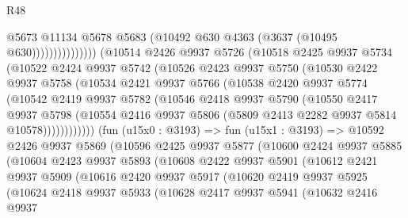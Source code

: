 \begin{lexlean}{R48}
\begin{coremodule}
                                @5673
                                @11134
                                @5678
                                @5683
                                (@10492 @630 @4363 (@3637 (@10495 @630)))))))))))))))
        (@10514
          @2426
          @9937
          @5726
          (@10518
            @2425
            @9937
            @5734
            (@10522
              @2424
              @9937
              @5742
              (@10526
                @2423
                @9937
                @5750
                (@10530
                  @2422
                  @9937
                  @5758
                  (@10534
                    @2421
                    @9937
                    @5766
                    (@10538
                      @2420
                      @9937
                      @5774
                      (@10542
                        @2419
                        @9937
                        @5782
                        (@10546
                          @2418
                          @9937
                          @5790
                          (@10550
                            @2417
                            @9937
                            @5798
                            (@10554
                              @2416
                              @9937
                              @5806
                              (@5809 @2413 @2282 @9937 @5814 @10578))))))))))))
        (fun (u15x0 : @3193) =>
        fun (u15x1 : @3193) =>
        @10592
          @2426
          @9937
          @5869
          (@10596
            @2425
            @9937
            @5877
            (@10600
              @2424
              @9937
              @5885
              (@10604
                @2423
                @9937
                @5893
                (@10608
                  @2422
                  @9937
                  @5901
                  (@10612
                    @2421
                    @9937
                    @5909
                    (@10616
                      @2420
                      @9937
                      @5917
                      (@10620
                        @2419
                        @9937
                        @5925
                        (@10624
                          @2418
                          @9937
                          @5933
                          (@10628
                            @2417
                            @9937
                            @5941
                            (@10632
                              @2416
                              @9937

\end{coremodule}
\end{lexlean}
